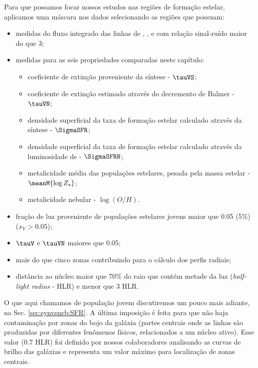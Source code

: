 Para que possamos focar nossos estudos nas regiões de formação estelar, aplicamos uma máscara nos
dados selecionando as regiões que possuam:
\begin{itemize}
  \setlength\itemsep{0.2cm}
  \item medidas do fluxo integrado das linhas de \Hbeta, \oIII, \Halpha e \nII com relação
sinal-ruído maior do que 3;
  \item medidas para as seis propriedades comparadas neste capítulo:
  \begin{itemize}
    \item coeficiente de extinção proveniente da síntese - $\tauVS$;
    \item coeficiente de extinção estimado através do decremento de Balmer - $\tauVN$;
    \item densidade superficial da taxa de formação estelar calculado através da síntese -
$\SigmaSFR$;
	\item densidade superficial da taxa de formação estelar calculado através da luminosidade de
\Halpha - $\SigmaSFRN$;
	\item metalicidade média das populações estelares, pesada pela massa estelar - $\meanM{\log
Z_\star}$;
	\item metalicidade nebular - $\log(O/H)$.
  \end{itemize}
  \item fração de luz proveniente de populações estelares jovens maior que 0.05 (5\%) ($x_Y >
0.05$);
  \item $\tauV$ e $\tauVN$ maiores que 0.05;
  \item mais do que cinco zonas contribuindo para o cálculo dos perfis radiais;
  \item distância ao núcleo maior que 70\% do raio que contém metade da luz ({\em half-light
 radius} - HLR) e menor que 3 HLR.
\end{itemize}
\noindent O que aqui chamamos de população jovem discutiremos um pouco mais adiante, na Sec.
\ref{sec:synvsneb:SFR}. A última imposição é feita para que não haja contaminação por zonas
do bojo da galáxia (partes centrais onde as linhas são produzidas por diferentes fenômenos físicos,
relacionados a um núcleo ativo). Esse valor (0.7 HLR) foi definido por nossos colaboradores
analisando as curvas de brilho das galáxias e representa um valor máximo para localização de zonas
centrais. 

